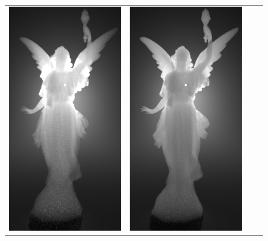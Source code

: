 \begin{figure}
\begin{tabular}{cc|cc}
        \includegraphics[width=\resLen]{images/lucy/pos_unc.jpg} &
        \includegraphics[width=\resLen]{images/lucy/pos_pos.jpg} 

\end{tabular}
\end{figure}
